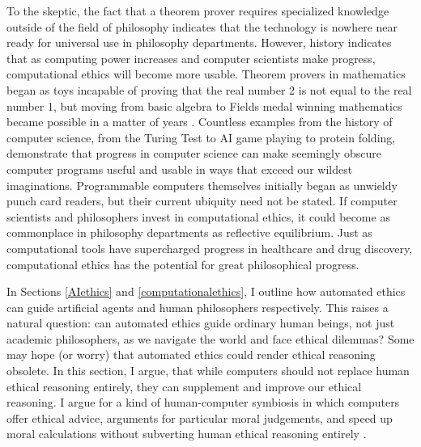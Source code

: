 \begin{isabellebody}
\begin{isamarkuptext}
To the skeptic, the fact that a theorem prover requires specialized knowledge outside of the field 
of philosophy indicates that the technology is nowhere near ready for universal use in philosophy 
departments. However, history indicates that as computing power increases and computer scientists make 
progress, computational ethics will become more usable. Theorem provers in mathematics began as toys 
incapable of proving that the real number 2 is not equal to the real number 1, but 
moving from basic algebra to Fields medal winning mathematics became possible in a
matter of years \citep{buzzardvideo}. Countless examples from the history of computer science, from the Turing 
Test to AI game playing to protein folding, demonstrate that progress in computer science can make seemingly 
obscure computer programs useful and usable in ways that exceed our wildest imaginations.
Programmable computers themselves initially began as unwieldy punch card readers, but their current ubiquity 
need not be stated. If computer scientists and philosophers invest in computational ethics, it could
become as commonplace in philosophy departments as reflective equilibrium. Just as computational tools
have supercharged progress in healthcare and drug discovery, computational ethics has the potential for
great philosophical progress.%
\end{isamarkuptext}\isamarkuptrue%
%
\isadelimdocument
%
\endisadelimdocument
%
\isatagdocument
%
\isamarkuptrue%
%
\endisatagdocument
{\isafolddocument}%
%
\isadelimdocument
%
\endisadelimdocument
%
\begin{isamarkuptext}%
In Sections \ref{AIethics} and \ref{computationalethics}, I outline how automated ethics can guide
artificial agents and human philosophers respectively. This raises a natural question: can automated
ethics guide ordinary human beings, not just academic philosophers, as we navigate the world and face ethical
dilemmas? Some may hope (or worry) that automated ethics could render ethical reasoning obsolete. In 
this section, I argue, that while computers should not replace human ethical reasoning entirely,
they can supplement and improve our ethical reasoning. I argue for a kind of human-computer symbiosis
in which computers offer ethical advice, arguments for particular moral judgements, and speed up moral
calculations without subverting human ethical reasoning entirely \citep{licklider}.


\end{isamarkuptext}
\end{isabellebody}
